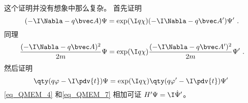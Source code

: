 这个证明并没有想象中那么复杂。 首先证明
\begin{equation}
(-\I\Nabla - q\bvec A)\Psi = \exp(\I q\chi)(-\I\Nabla - q\bvec A')\Psi'~.
\end{equation}
同理
\begin{equation}\label{eq_QMEM_4}
\frac{(-\I\Nabla - q\bvec A)^2}{2m}\Psi = \exp(\I q\chi)\frac{(-\I\Nabla - q\bvec A')^2}{2m}\Psi'~.
\end{equation}
然后证明
\begin{equation}\label{eq_QMEM_7}
\qty(q\varphi - \I \pdv{t})\Psi= \exp(\I q\chi)\qty(q\varphi' - \I \pdv{t})\Psi'~
\end{equation}
\autoref{eq_QMEM_4} 和\autoref{eq_QMEM_7} 相加可证 $H'\Psi = \I \dot\Psi'$。
